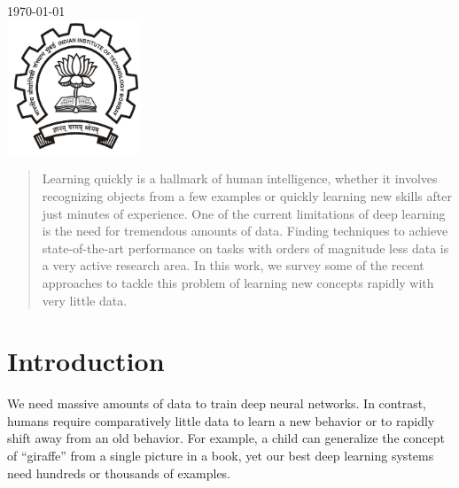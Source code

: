 \begin{titlepage}

{\large \today}\\[2cm] %


\includegraphics[height=4cm]{logo.jpg}\\[1cm] %
 

\vfill %

\end{titlepage}


\tableofcontents
\pagebreak

\begin{abstract}
Learning quickly is a hallmark of human intelligence, whether it involves recognizing objects from a few examples or quickly learning new skills after just minutes of experience. One of the current limitations of deep learning is the need for tremendous amounts of data.
Finding techniques to achieve state-of-the-art performance on tasks with orders of magnitude less data is a very active research area. In this work, we survey some of the recent approaches to tackle this problem of learning new concepts rapidly with very little data.
\end{abstract}

\section{Introduction}

We need massive amounts of data to train deep neural networks. In contrast, humans require comparatively little data to learn a new behavior or to rapidly shift away from an old behavior. For example,  a child can generalize the concept of “giraffe” from a single picture in a book, yet our best deep learning systems need hundreds or thousands of examples.\\

